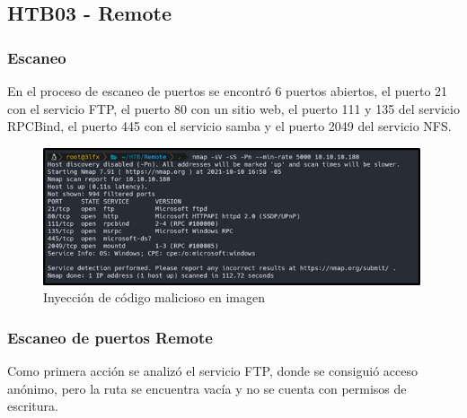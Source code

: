 \subsection{HTB03 - Remote}
\subsubsection{Escaneo}
En el proceso de escaneo de puertos se encontró 6 puertos abiertos, el puerto 21 con el servicio FTP, el puerto 80 con un sitio web, el puerto 111 y 135 del servicio RPCBind, el puerto 445 con el servicio samba y el puerto 2049 del servicio NFS.
\begin{figure}[H]
    \centering
    \includegraphics[width=0.99\textwidth]{imagenes/scanrem.png}
    \caption{Inyección de código malicioso en imagen}
\end{figure}
\subsubsection{Escaneo de puertos Remote}
Como primera acción se analizó el servicio FTP, donde se consiguió acceso anónimo, pero la ruta se encuentra vacía y no se cuenta con permisos de escritura.

